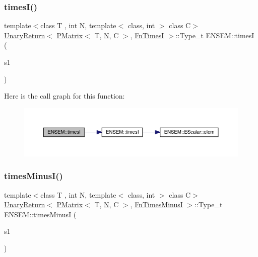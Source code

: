 \subsubsection{\texorpdfstring{timesI()}{timesI()}}
{\footnotesize\ttfamily template$<$class T , int N, template$<$ class, int $>$ class C$>$ \\
\mbox{\hyperlink{structENSEM_1_1UnaryReturn}{Unary\+Return}}$<$ \mbox{\hyperlink{classENSEM_1_1PMatrix}{P\+Matrix}}$<$ T, \mbox{\hyperlink{operator__name__util_8cc_a7722c8ecbb62d99aee7ce68b1752f337}{N}}, C $>$, \mbox{\hyperlink{structENSEM_1_1FnTimesI}{Fn\+TimesI}} $>$\+::Type\+\_\+t E\+N\+S\+E\+M\+::timesI (\begin{DoxyParamCaption}\item[{const \mbox{\hyperlink{classENSEM_1_1PMatrix}{P\+Matrix}}$<$ T, \mbox{\hyperlink{operator__name__util_8cc_a7722c8ecbb62d99aee7ce68b1752f337}{N}}, C $>$ \&}]{s1 }\end{DoxyParamCaption})\hspace{0.3cm}{\ttfamily [inline]}}

Here is the call graph for this function\+:\nopagebreak
\begin{figure}[H]
\begin{center}
\leavevmode
\includegraphics[width=350pt]{df/d0a/group__primmatrix_ga9f1d3892badcfa2bf78d97c42c8a05e5_cgraph}
\end{center}
\end{figure}
\mbox{\label{group__primmatrix_ga937a4152dd7d0ceaec303ddbdbaf5a98}} 
\subsubsection{\texorpdfstring{timesMinusI()}{timesMinusI()}}
{\footnotesize\ttfamily template$<$class T , int N, template$<$ class, int $>$ class C$>$ \\
\mbox{\hyperlink{structENSEM_1_1UnaryReturn}{Unary\+Return}}$<$ \mbox{\hyperlink{classENSEM_1_1PMatrix}{P\+Matrix}}$<$ T, \mbox{\hyperlink{operator__name__util_8cc_a7722c8ecbb62d99aee7ce68b1752f337}{N}}, C $>$, \mbox{\hyperlink{structENSEM_1_1FnTimesMinusI}{Fn\+Times\+MinusI}} $>$\+::Type\+\_\+t E\+N\+S\+E\+M\+::times\+MinusI (\begin{DoxyParamCaption}\item[{const \mbox{\hyperlink{classENSEM_1_1PMatrix}{P\+Matrix}}$<$ T, \mbox{\hyperlink{operator__name__util_8cc_a7722c8ecbb62d99aee7ce68b1752f337}{N}}, C $>$ \&}]{s1 }\end{DoxyParamCaption})\hspace{0.3cm}{\ttfamily [inline]}}

